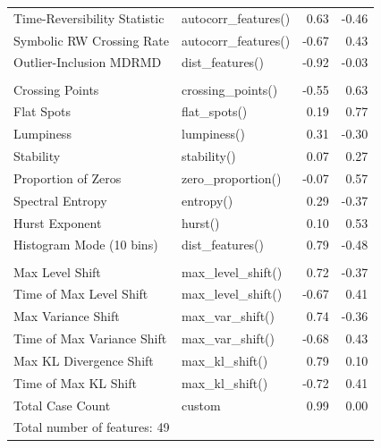 \begin{table}
\begin{tabular}[t]{llrr}
\hspace{1em}Time-Reversibility Statistic & autocorr\_features() & 0.63 & -0.46\\
\hspace{1em}Symbolic RW Crossing Rate & autocorr\_features() & -0.67 & 0.43\\
\hspace{1em}Outlier-Inclusion MDRMD & dist\_features() & -0.92 & -0.03\\
\addlinespace[0.3em]
\multicolumn{4}{l}{\textbf{Distributional Summary}}\\
\hspace{1em}Crossing Points & crossing\_points() & -0.55 & 0.63\\
\hspace{1em}Flat Spots & flat\_spots() & 0.19 & 0.77\\
\hspace{1em}Lumpiness & lumpiness() & 0.31 & -0.30\\
\hspace{1em}Stability & stability() & 0.07 & 0.27\\
\hspace{1em}Proportion of Zeros & zero\_proportion() & -0.07 & 0.57\\
\hspace{1em}Spectral Entropy & entropy() & 0.29 & -0.37\\
\hspace{1em}Hurst Exponent & hurst() & 0.10 & 0.53\\
\hspace{1em}Histogram Mode (10 bins) & dist\_features() & 0.79 & -0.48\\
\addlinespace[0.3em]
\multicolumn{4}{l}{\textbf{Regime Shifts \& Scale}}\\
\hspace{1em}Max Level Shift & max\_level\_shift() & 0.72 & -0.37\\
\hspace{1em}Time of Max Level Shift & max\_level\_shift() & -0.67 & 0.41\\
\hspace{1em}Max Variance Shift & max\_var\_shift() & 0.74 & -0.36\\
\hspace{1em}Time of Max Variance Shift & max\_var\_shift() & -0.68 & 0.43\\
\hspace{1em}Max KL Divergence Shift & max\_kl\_shift() & 0.79 & 0.10\\
\hspace{1em}Time of Max KL Shift & max\_kl\_shift() & -0.72 & 0.41\\
\hspace{1em}Total Case Count & custom & 0.99 & 0.00\\
\bottomrule
\multicolumn{4}{l}{\rule{0pt}{1em}Total number of features: 49}\\
\end{tabular}
\end{table}
